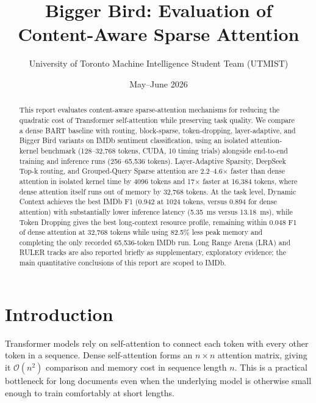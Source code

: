 \documentclass[11pt]{article}
\title{Bigger Bird: Evaluation of Content-Aware Sparse Attention}
\author{University of Toronto Machine Intelligence Student Team (UTMIST)}
\date{May--June 2026}
\newcommand{\bigO}{\mathcal{O}}
\begin{document}
\maketitle

\begin{abstract}
This report evaluates content-aware sparse-attention mechanisms for reducing the
quadratic cost of Transformer self-attention while preserving task quality. We
compare a dense BART baseline with routing, block-sparse, token-dropping,
layer-adaptive, and Bigger Bird variants on IMDb sentiment classification, using
an isolated attention-kernel benchmark (128--32{,}768 tokens, CUDA, 10 timing
trials) alongside end-to-end training and inference runs (256--65{,}536 tokens).
Layer-Adaptive Sparsity, DeepSeek Top-k routing, and Grouped-Query Sparse
attention are 2.2--4.6$\times$ faster than dense attention in isolated kernel
time by 4096 tokens and 17$\times$ faster at 16{,}384 tokens, where dense
attention itself runs out of memory by 32{,}768 tokens. At the task level,
Dynamic Context achieves the best IMDb F1 (0.942 at 1024 tokens, versus 0.894
for dense attention) with substantially lower inference latency (5.35~ms versus
13.18~ms), while Token Dropping gives the best long-context resource profile,
remaining within 0.048 F1 of dense attention at 32{,}768 tokens while using
82.5\% less peak memory and completing the only recorded 65{,}536-token IMDb
run. Long Range Arena (LRA) and RULER tracks are also reported briefly as
supplementary, exploratory evidence; the main quantitative conclusions of this
report are scoped to IMDb.
\end{abstract}

\newpage
\tableofcontents

\newpage
\section{Introduction}

Transformer models rely on self-attention to connect each token with every
other token in a sequence. Dense self-attention forms an $n\times n$ attention
matrix, giving it $\bigO(n^2)$ comparison and memory cost in sequence length
$n$. This is a practical bottleneck for long documents even when the
underlying model is otherwise small enough to train comfortably at short
lengths.
\end{document}
